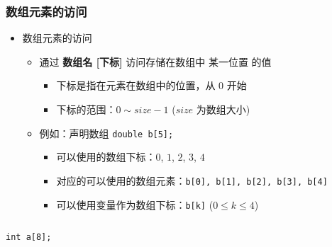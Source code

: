 \begin{frame}[fragile]
    \frametitle{数组元素的访问}

    \begin{overlayarea}{\textwidth}{.55\textheight}
        \begin{itemize}
            \item 数组元素的访问

                \begin{itemize}
                    \item 通过 \textbf{数组名 [下标]} 访问存储在数组中 某一位置 的值
                        \begin{itemize}
                            \item 下标是指在元素在数组中的位置，从 $0$ 开始
                            \item 下标的范围：$0 \sim size - 1$ ($size$ 为数组大小)
                        \end{itemize}
                \end{itemize}

                \begin{itemize}
                    \item 例如：声明数组 \lstinline|double b[5];|
                        \begin{itemize}
                            \item 可以使用的数组下标：$0$, $1$, $2$, $3$, $4$
                            \item 对应的可以使用的数组元素：\lstinline|b[0], b[1], b[2], b[3], b[4]|
                            \item 可以使用变量作为数组下标：\lstinline|b[k]| ($0 \le k \le 4$)
                        \end{itemize}
                \end{itemize}
        \end{itemize}
    \end{overlayarea}

    \begin{columns}

        \lstinline|int a[8];|

    \end{columns}
\end{frame}

